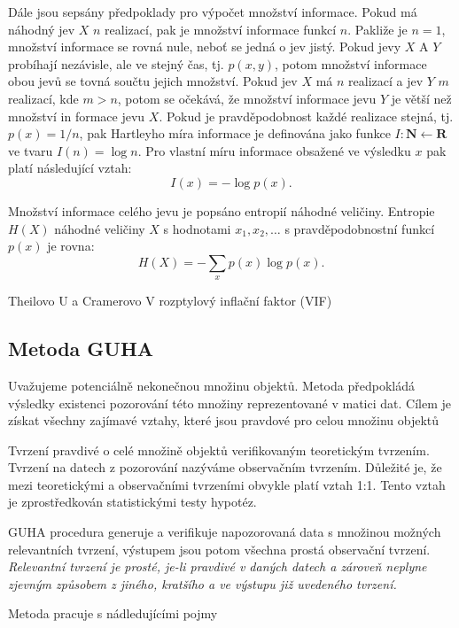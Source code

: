 Dále jsou sepsány předpoklady pro výpočet množství informace. Pokud má náhodný jev $X$ $n$ realizací, pak je množství informace funkcí $n$. Pakliže je $n=1$, množství informace se rovná nule, neboť se jedná o jev jistý. 
Pokud jevy $X$ A $Y$ probíhají nezávisle, ale ve stejný čas, tj. $p(x,y)$, potom množství informace obou jevů se tovná součtu jejich množství.
Pokud jev $X$ má $n $ realizací a jev $Y$ $m$ realizací, kde $m>n$, potom se očekává, že množství informace jevu $Y$ je větší než množství in
formace jevu $X$. \cite{bib:MI2} Pokud je pravděpodobnost každé realizace stejná, tj. $p(x) = 1/n$, pak  Hartleyho míra informace je definována jako funkce $I: \mathbf{N} \leftarrow \mathbf{R}$ ve tvaru $I(n)=\log n$. Pro vlastní míru informace obsažené ve výsledku $x$ pak platí následující vztah: \cite{bib:MI2}
 $$I(x)=- \log p(x).$$

Množství informace celého jevu je popsáno entropií náhodné veličiny. Entropie $H(X)$ náhodné veličiny $X$ s hodnotami $x_1, x_2, \ldots $ s pravděpodobnostní funkcí $p(x)$ je rovna: $$H(X) = -\sum_x p(x) \log p(x).$$

\newpage
Theilovo U a Cramerovo V
rozptylový inflační faktor (VIF)

\subsection{Metoda GUHA}
\label{sec:Teorie:Guha}
Uvažujeme potenciálně nekonečnou množinu objektů. Metoda předpokládá výsledky existenci pozorování této množiny reprezentované v matici dat. Cílem je získat všechny zajímavé vztahy, které jsou pravdové pro celou množinu objektů

Tvrzení pravdivé o celé množině objektů verifikovaným teoretickým tvrzením. Tvrzení na datech z pozorování nazýváme observačním tvrzením. Důležité je, že mezi teoretickými a observačními tvrzeními obvykle platí vztah 1:1. Tento vztah je zprostředkován statistickými testy hypotéz.

GUHA procedura generuje a verifikuje napozorovaná data s množinou možných relevantních tvrzení, výstupem jsou potom všechna prostá observační tvrzení. \textit{Relevantní tvrzení je prosté, je-li pravdivé v daných datech a zároveň neplyne zjevným způsobem z jiného, kratšího a ve výstupu již uvedeného tvrzení.} %

Metoda pracuje s nádledujícími pojmy

